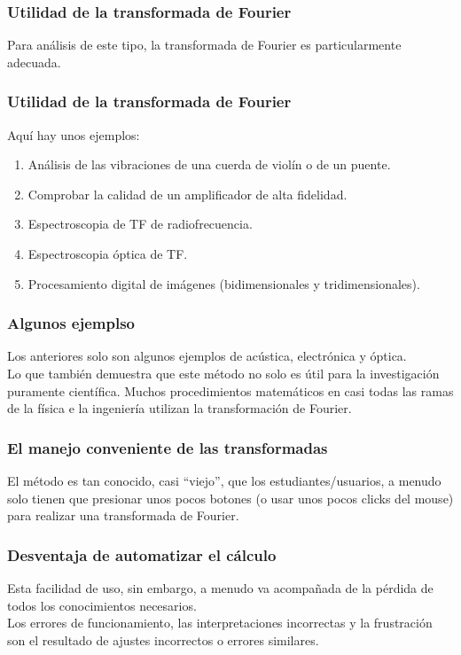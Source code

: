 \documentclass[12pt]{beamer}
\begin{document}
\begin{frame}
\frametitle{Utilidad de la transformada de Fourier}
Para análisis de este tipo, la transformada de Fourier es particularmente adecuada.
\end{frame}
\begin{frame}
\frametitle{Utilidad de la transformada de Fourier}
Aquí hay unos ejemplos:
\pause
{}
\begin{enumerate}[<+->]
\item Análisis de las vibraciones de una cuerda de violín o de un puente.
\item Comprobar la calidad de un amplificador de alta fidelidad.
\item Espectroscopia de TF de radiofrecuencia.
\item Espectroscopia óptica de TF.
\item Procesamiento digital de imágenes (bidimensionales y tridimensionales).
\end{enumerate}
\end{frame}
\begin{frame}
\frametitle{Algunos ejemplso}
Los anteriores solo son algunos ejemplos de acústica, electrónica y óptica.
\\
\bigskip
\pause
Lo que también demuestra que este método no solo es útil para la investigación puramente científica. \pause Muchos procedimientos matemáticos en casi todas las ramas de la física e la ingeniería utilizan la transformación de Fourier.
\end{frame}
\begin{frame}
\frametitle{El manejo conveniente de las transformadas}
El método es tan conocido, casi \enquote{viejo}, que los estudiantes/usuarios, a menudo solo tienen que presionar unos pocos botones (o usar unos pocos clicks del mouse) para realizar una transformada de Fourier.
\end{frame}
\begin{frame}
\frametitle{Desventaja de automatizar el cálculo}
Esta facilidad de uso, sin embargo, a menudo va acompañada de la pérdida de todos los conocimientos necesarios.
\\
\bigskip
\pause
Los errores de funcionamiento, las interpretaciones incorrectas y la frustración son el resultado de ajustes incorrectos o errores similares.
\end{frame}
\end{document}

